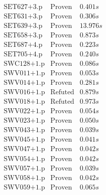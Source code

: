 \documentclass[a4paper,11pt]{report}
\theoremstyle{definition}
\theoremstyle{definition}
\theoremstyle{definition}
\theoremstyle{definition}
\theoremstyle{definition}
\theoremstyle{definition}
\theoremstyle{definition}
\begin{document}
\begin{minipage}{0.45\textwidth}
\[\begin{matrix}
			\text{SET627+3.p}&\text{Proven}& 0.401 s\\
			\text{SET631+3.p}&\text{Proven}& 0.306 s\\
			\text{SET639+3.p}&\text{Proven}& 13.976 s\\
			\text{SET658+3.p}&\text{Proven}& 0.873 s\\
			\text{SET687+4.p}&\text{Proven}& 0.223 s\\
			\text{SET705+4.p}&\text{Proven}& 0.240 s\\
			\text{SWC128+1.p}&\text{Proven}& 0.086 s\\
			\text{SWV011+1.p}&\text{Proven}& 0.053 s\\
			\text{SWV014+1.p}&\text{Proven}& 0.281 s\\
			\text{SWV016+1.p}&\text{Refuted}& 0.879 s\\
			\text{SWV018+1.p}&\text{Refuted}& 0.973 s\\
			\text{SWV022+1.p}&\text{Proven}& 0.054 s\\
			\text{SWV023+1.p}&\text{Proven}& 0.050 s\\
			\text{SWV043+1.p}&\text{Proven}& 0.039 s\\
			\text{SWV045+1.p}&\text{Proven}& 0.041 s\\
			\text{SWV047+1.p}&\text{Proven}& 0.042 s\\
			\text{SWV054+1.p}&\text{Proven}& 0.042 s\\
			\text{SWV057+1.p}&\text{Proven}& 0.039 s\\
			\text{SWV058+1.p}&\text{Proven}& 0.042 s\\
			\text{SWV059+1.p}&\text{Proven}& 0.065 s\\
		\end{matrix}\]
	\end{minipage}
	
	\pagebreak
	
\end{document}
